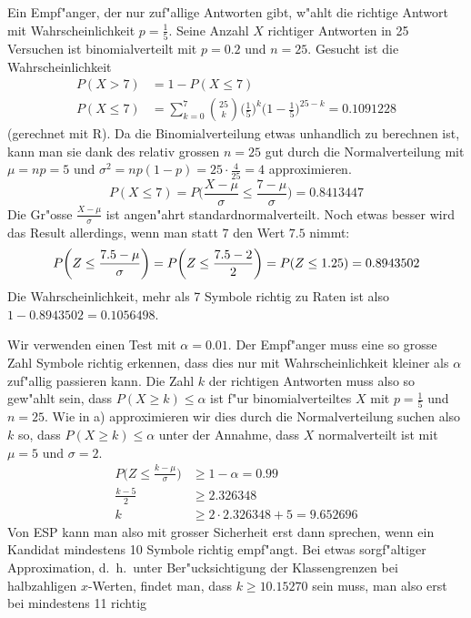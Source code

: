 \begin{loesung}
\begin{teilaufgaben}
\item Ein Empf"anger, der nur zuf"allige Antworten gibt, w"ahlt
die richtige Antwort mit Wahrscheinlichkeit $p=\frac15$.
Seine Anzahl $X$ richtiger Antworten in 25 Versuchen ist binomialverteilt mit
$p=0.2$ und $n=25$. Gesucht ist die Wahrscheinlichkeit
\begin{align*}
P(X > 7)&= 1 - P(X\le 7)\\
P(X\le 7)&=\sum_{k=0}^7\binom{25}{k}
\biggl(\frac15\biggr)^k
\biggl(1-\frac15\biggr)^{25-k}
 = 0.1091228
\end{align*}
(gerechnet mit R).
Da die Binomialverteilung etwas unhandlich zu berechnen ist, kann man sie
dank des relativ grossen $n=25$ gut durch die Normalverteilung
mit $\mu=np=5$ und $\sigma^2=np(1-p)=25\cdot\frac{4}{25}=4$
approximieren.
\[
P(X\le 7)=P\biggl(\frac{X-\mu}{\sigma}\le \frac{7-\mu}{\sigma}\biggr)
=
0.8413447
\]
Die Gr"osse $\frac{X-\mu}{\sigma}$ ist angen"ahrt standardnormalverteilt.
Noch etwas besser wird das Result allerdings, wenn man statt $7$ den
Wert $7.5$ nimmt:
\[
P\biggl(Z\le\frac{7.5-\mu}{\sigma}\biggr)
=
P\biggl(Z\le \frac{7.5-2}{2}\biggr)
=
P(Z\le 1.25)=0.8943502\\
\]
Die Wahrscheinlichkeit, mehr als 7 Symbole richtig zu Raten ist
also $1-0.8943502= 0.1056498$.
\item
Wir verwenden einen Test mit $\alpha=0.01$.
Der Empf"anger muss eine so grosse Zahl Symbole richtig erkennen,
dass dies nur mit Wahrscheinlichkeit kleiner als $\alpha$ zuf"allig
passieren kann.
Die Zahl $k$ der richtigen Antworten muss also so gew"ahlt sein,
dass $P(X\ge k) \le \alpha$ ist f"ur binomialverteiltes $X$ mit $p=\frac15$
und $n=25$. Wie in a) approximieren wir dies durch die Normalverteilung
suchen also $k$ so, dass $P(X\ge k)\le\alpha$ unter der Annahme, dass
$X$ normalverteilt ist mit $\mu=5$ und $\sigma=2$.
\begin{align*}
P\biggl(Z\le \frac{k - \mu}{\sigma}\biggr)&\ge 1-\alpha=0.99\\
\frac{k-5}2&\ge 2.326348\\
k&\ge 2\cdot 2.326348 + 5=9.652696
\end{align*}
Von ESP kann man also mit grosser Sicherheit erst dann sprechen, wenn
ein Kandidat mindestens 10 Symbole richtig empf"angt.
Bei etwas sorgf"altiger Approximation, d.~h.~unter Ber"ucksichtigung
der Klassengrenzen bei halbzahligen $x$-Werten, findet man, dass
$k\ge 10.15270$ sein muss, man also erst bei mindestens 11 richtig

\end{teilaufgaben}
\end{loesung}
